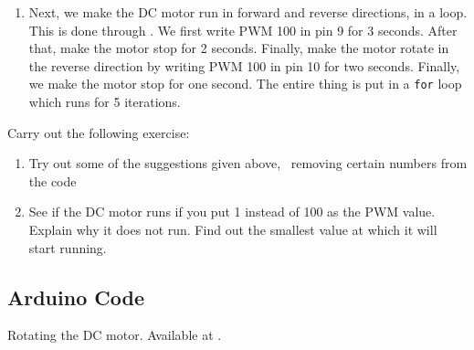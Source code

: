 \begin{enumerate}
  \item Next, we make the DC motor run in forward and reverse
        directions, in a loop.  This is done through
        .  We first write PWM 100 in pin 9 for 3
        seconds.  After that, make the motor stop for 2 seconds.  Finally,
        make the motor rotate in the reverse direction by writing PWM 100 in pin 10
        for two seconds.  Finally, we make the motor stop for one second.
        The entire thing is put in a {\tt for} loop which runs for 5 iterations. 
\end{enumerate}

\begin{exercise}
  Carry out the following exercise:
  \begin{enumerate}
    \item Try out some of the suggestions given above, \ie\ removing
          certain numbers from the code
    \item See if the DC motor runs if you put 1 instead of 100 as the PWM
          value.  Explain why it does not run.  Find out the smallest value at
          which it will start running.
  \end{enumerate}
\end{exercise}

\subsection{Arduino Code}
\label{sec:dcmotor-arduino-code}
\lstset{style=mystyle}

\begin{ardcode}
  {Rotating the DC motor.  Available at
    .}
  \label{ard:dcmotor-clock}
  
\end{ardcode}

\begin{ardcode}
  \label{ard:dcmotor-both}
  
\end{ardcode}

\begin{ardcode}
  \label{ard:dcmotor-loop}
  
\end{ardcode}


